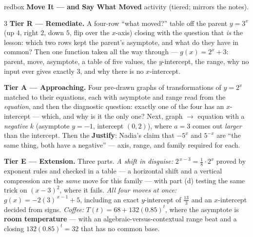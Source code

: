 \documentclass[10pt]{article}
\begin{document}
\begin{skillbox}{redbox}
\textbf{Move It --- and Say What Moved} activity (tiered; mirrors the notes).
\begin{multicols}{3}
\textbf{Tier R --- Remediate.} A four-row ``what moved?'' table off the parent $y=3^{x}$ (up $4$,
right $2$, down $5$, flip over the $x$-axis) closing with the question that \emph{is} the lesson:
which two rows kept the parent's asymptote, and what do they have in common? Then one function taken
all the way through --- $g(x)=2^{x}+3$: parent, move, asymptote, a table of five values, the
$y$-intercept, the range, why no input ever gives exactly $3$, and why there is no $x$-intercept.

\columnbreak
\textbf{Tier A --- Approaching.} Four pre-drawn graphs of transformations of $y=2^{x}$ matched to
their equations, each with asymptote and range read from the \emph{equation}, and then the diagnostic
question: exactly one of the four has an $x$-intercept --- which, and why is it the only one? Next,
graph $\to$ equation with a \emph{negative} $k$ (asymptote $y=-1$, intercept $(0,2)$), where $a=3$
comes out \emph{larger} than the intercept. Then the \textbf{Justify}: Nadia's claim that $-5^{x}$ and
$5^{-x}$ are ``the same thing, both have a negative'' --- axis, range, and family required for each.

\columnbreak
\textbf{Tier E --- Extension.} Three parts. \emph{A shift in disguise:} $2^{\,x-3}=\frac18\cdot2^{x}$
proved by exponent rules and checked in a table --- a horizontal shift and a vertical compression are
the \emph{same} move for this family --- with part (d) testing the same trick on $(x-3)^{2}$, where it
fails. \emph{All four moves at once:} $g(x)=-2(3)^{\,x-1}+5$, including an exact $y$-intercept of
$\frac{13}{3}$ and an $x$-intercept decided from signs. \emph{Coffee:} $T(t)=68+132(0.85)^{t}$, where
the asymptote is \textbf{room temperature} --- with an algebraic-versus-contextual range beat and a
closing $132(0.85)^{t}=32$ that has no common base.
\end{multicols}
\end{skillbox}
\end{document}
